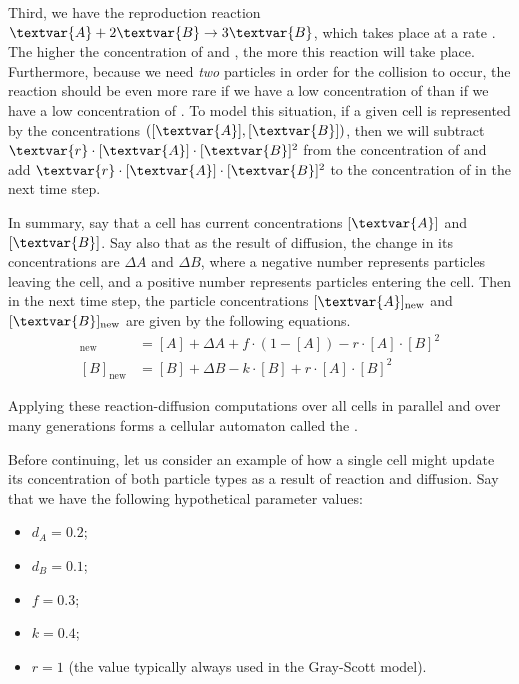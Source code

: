 Third, we have the reproduction reaction $\textvar{A} + 2\textvar{B} \rightarrow 3\textvar{B}$, which takes place at a rate . The higher the concentration of  and , the more this reaction will take place. Furthermore, because we need \textit{two}  particles in order for the collision to occur, the reaction should be even more rare if we have a low concentration of  than if we have a low concentration of . To model this situation, if a given cell is represented by the concentrations $([\textvar{A}], [\textvar{B}])$, then we will subtract $\textvar{r} \cdot [\textvar{A}] \cdot [\textvar{B}]^2$ from the concentration of  and add $\textvar{r} \cdot [\textvar{A}] \cdot [\textvar{B}]^2$ to the concentration of  in the next time step.

In summary, say that a cell has current concentrations $[\textvar{A}]$ and $[\textvar{B}]$. Say also that as the result of diffusion, the change in its concentrations are $\Delta A$ and $\Delta B$, where a negative number represents particles leaving the cell, and a positive number represents particles entering the cell. Then in the next time step, the particle concentrations $[\textvar{A}]_{\text{new}}$ and $[\textvar{B}]_{\text{new}}$ are given by the following equations.
\begin{align*}
[A]_{\text{new}} & = [A] + \Delta A + f \cdot (1-[A]) - r \cdot [A] \cdot [B]^2\\
[B]_{\text{new}} & = [B] + \Delta B - k \cdot [B] + r \cdot [A] \cdot [B]^2
\end{align*}

Applying these reaction-diffusion computations over all cells in parallel and over many generations forms a cellular automaton called the .

Before continuing, let us consider an example of how a single cell might update its concentration of both particle types as a result of reaction and diffusion.  Say that we have the following hypothetical parameter values:

\begin{itemize}
\item $d_A = 0.2$;
\item $d_B = 0.1$;
\item $f = 0.3$;
\item $k = 0.4$;
\item $r = 1$ (the value typically always used in the Gray-Scott model).
\end{itemize}

